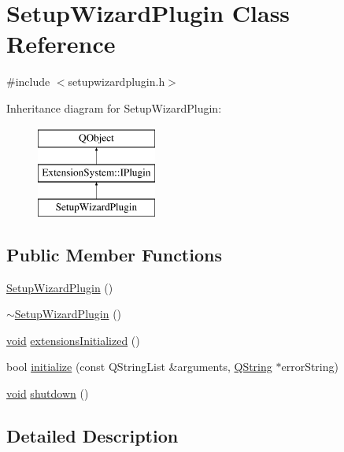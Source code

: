 \hypertarget{class_setup_wizard_plugin}{\section{Setup\-Wizard\-Plugin Class Reference}
\label{class_setup_wizard_plugin}
}


{\ttfamily \#include $<$setupwizardplugin.\-h$>$}

Inheritance diagram for Setup\-Wizard\-Plugin\-:\begin{figure}[H]
\begin{center}
\leavevmode
\includegraphics[height=3.000000cm]{class_setup_wizard_plugin}
\end{center}
\end{figure}
\subsection*{Public Member Functions}
\begin{DoxyCompactItemize}
\item 
\hyperlink{group___setup_wizard_plugin_ga3aa7966c2f38a762e4669751ccdf470a}{Setup\-Wizard\-Plugin} ()
\item 
\hyperlink{group___setup_wizard_plugin_ga57537cb52f05ade3a3fbe59ca00d187b}{$\sim$\-Setup\-Wizard\-Plugin} ()
\item 
\hyperlink{group___u_a_v_objects_plugin_ga444cf2ff3f0ecbe028adce838d373f5c}{void} \hyperlink{group___setup_wizard_plugin_gaa612baf865ac69fa057ec64987c86ff4}{extensions\-Initialized} ()
\item 
bool \hyperlink{group___setup_wizard_plugin_ga2ea2069466d237ee561815a5a00f7a4e}{initialize} (const Q\-String\-List \&arguments, \hyperlink{group___u_a_v_objects_plugin_gab9d252f49c333c94a72f97ce3105a32d}{Q\-String} $\ast$error\-String)
\item 
\hyperlink{group___u_a_v_objects_plugin_ga444cf2ff3f0ecbe028adce838d373f5c}{void} \hyperlink{group___setup_wizard_plugin_ga982d4e38aff329d0dfc32506a4eb5539}{shutdown} ()
\end{DoxyCompactItemize}


\subsection{Detailed Description}


